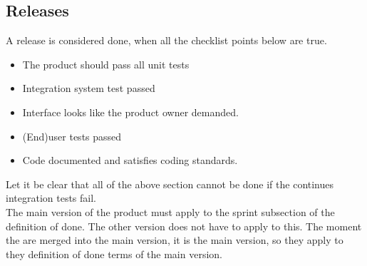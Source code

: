 \documentclass{article}
\begin{document}
\subsection{Releases}
A release is considered done, when all the checklist points below are true.
\begin{itemize}
	\item The product should pass all unit tests
	\item Integration system test passed
	\item Interface looks like the product owner demanded.
	\item (End)user tests passed
	\item Code documented and satisfies coding standards.
\end{itemize}
Let it be clear that all of the above section cannot be done if the continues integration tests fail.\\
The main version of the product must apply to the sprint subsection of the definition of done. The other version does not have to apply to this. The moment the are merged into the main version, it is the main version, so they apply to they definition of done terms of the main version.
\clearpage
\printglossaries
\end{document}
